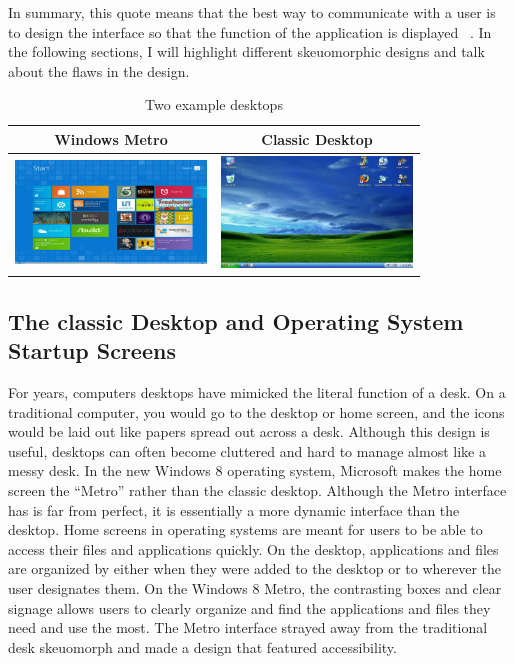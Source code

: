 \documentclass{article}
\begin{document}
In summary, this quote means that the best way to communicate with a user is to design the interface so that the function of the application is displayed ~\cite{Gizmodo}. In the following sections, I will highlight different skeuomorphic designs and talk about the flaws in the design.

\begin{table}
\centering
\begin{tabular}{|c|c|}\hline
Windows Metro & Classic Desktop \\\hline\hline
\includegraphics[width = 2in]{metro.jpeg} & \includegraphics[width = 2in]{pc-desktop.jpeg} \\\hline
\end{tabular}

\caption{Two example desktops}
\label{desktops}
\end{table}

\subsection{The classic Desktop and Operating System Startup Screens}
	For years, computers desktops have mimicked the literal function of a desk. On a traditional computer, you would go to the desktop or home screen, and the icons would be laid out like papers spread out across a desk. Although this design is useful, desktops can often become cluttered and hard to manage almost like a messy desk. In the new Windows 8 operating system, Microsoft makes the home screen the “Metro” rather than the classic desktop. Although the Metro interface has is far from perfect, it is essentially a more dynamic interface than the desktop. Home screens in operating systems are meant for users to be able to access their files and applications quickly. On the desktop, applications and files are organized by either when they were added to the desktop or to wherever the user designates them. On the Windows 8 Metro, the contrasting boxes and clear signage allows users to clearly organize and find the applications and files they need and use the most. The Metro interface strayed away from the traditional desk skeuomorph and made a design that featured accessibility. 
\end{document}

